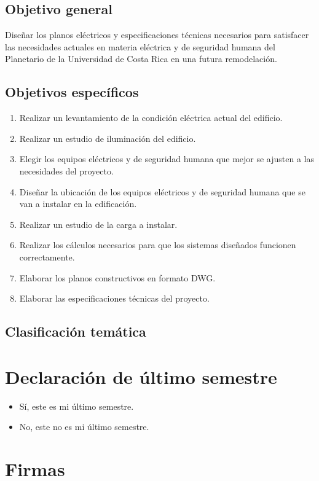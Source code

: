\documentclass{anteproyecto}
\begin{document}
\fi

\subsection*{Objetivo general}
\ifvacio
\vspace{4cm}
\else
Diseñar los planos eléctricos y especificaciones técnicas necesarios para satisfacer las necesidades actuales en materia eléctrica y de seguridad humana del Planetario de la Universidad de Costa Rica en una futura remodelación.
\fi

\subsection*{Objetivos específicos}
\ifvacio
	\vspace{4cm}
\else
\begin{enumerate}
\item Realizar un levantamiento de la condición eléctrica actual del edificio.
\item Realizar un estudio de iluminación del edificio.
\item Elegir los equipos eléctricos y de seguridad humana que mejor se ajusten a las necesidades del proyecto.
\item Diseñar la ubicación de los equipos eléctricos y de seguridad humana que se van a instalar en la edificación.
\item Realizar un estudio de la carga a instalar.
\item Realizar los cálculos necesarios para que los sistemas diseñados funcionen correctamente.
\item Elaborar los planos constructivos en formato DWG.
\item Elaborar las especificaciones técnicas del proyecto.
\end{enumerate}
\fi

\subsection*{Clasificación temática}
\ifvacio
	\vspace{1cm}
\else
   
\fi

\section*{Declaración de último semestre}

\begin{itemize}
\item[\seleccionar{*}] Sí, este es mi último semestre.
\item[\seleccionar{}] No, este no es mi último semestre.

\end{itemize}

\section*{Firmas}

\firmas


\end{document}
